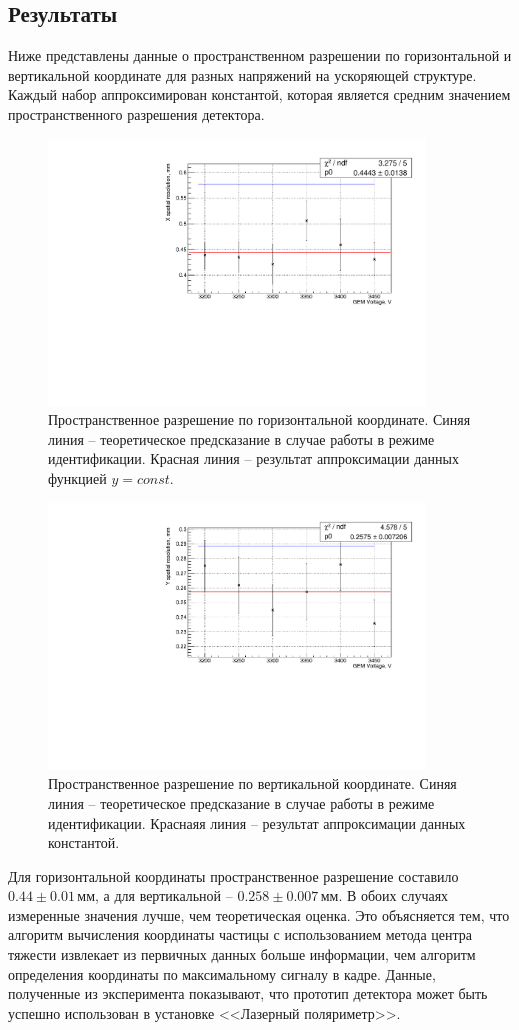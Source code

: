 \subsection{Результаты}
Ниже представлены данные о пространственном разрешении по горизонтальной и вертикальной координате для разных напряжений на ускоряющей структуре. Каждый набор аппроксимирован константой, которая является средним значением пространственного разрешения детектора. 
\begin{figure}[H]
	\centering
	\includegraphics[width= 10cm]{img/x_sp_res.pdf}
	\caption{Пространственное разрешение по горизонтальной координате. Синяя линия -- теоретическое предсказание в случае работы в режиме идентификации. Красная линия -- результат аппроксимации данных функцией $y = const$.}
	\label{fig:x_sp_res}
\end{figure}

\begin{figure}[H]
	\centering
	\includegraphics[width= 10cm]{img/y_sp_res.pdf}
	\caption{Пространственное разрешение по вертикальной координате. Синяя линия -- теоретическое предсказание в случае работы в режиме идентификации. Краснаяя линия -- результат аппроксимации данных константой.}
	\label{fig:y_sp_res}
\end{figure}
Для горизонтальной координаты пространственное разрешение составило $0.44 \pm 0.01$\,мм, а для вертикальной  -- $0.258 \pm 0.007$\,мм. В обоих случаях измеренные значения лучше, чем теоретическая оценка. Это объясняется тем, что алгоритм вычисления координаты частицы с использованием метода центра тяжести извлекает из первичных данных больше информации, чем алгоритм определения координаты по максимальному сигналу в кадре. Данные, полученные из эксперимента показывают, что прототип детектора может быть успешно использован в установке <<Лазерный поляриметр>>.
 